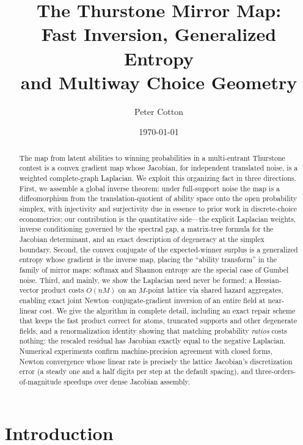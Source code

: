 \documentclass[11pt]{article}
\title{The Thurstone Mirror Map:\\ Fast Inversion, Generalized Entropy\\ and Multiway Choice Geometry}
\author{Peter Cotton}
\date{\today}
\theoremstyle{definition}
\theoremstyle{remark}
\begin{document}
\maketitle

\begin{abstract}
The map from latent abilities to winning probabilities in a multi-entrant
Thurstone contest is a convex gradient map whose Jacobian, for independent
translated noise, is a weighted complete-graph Laplacian.  We exploit this
organizing fact in three directions.  First, we assemble a global inverse
theorem: under full-support noise the map is a diffeomorphism from the
translation-quotient of ability space onto the open probability simplex, with
injectivity and surjectivity due in essence to prior work in discrete-choice
econometrics; our contribution is the quantitative side---the explicit
Laplacian weights, inverse conditioning governed by the spectral gap, a
matrix-tree formula for the Jacobian determinant, and an exact description of
degeneracy at the simplex boundary.  Second, the convex conjugate of the
expected-winner surplus is a generalized entropy whose gradient is the inverse
map, placing the ``ability transform'' in the family of mirror maps: softmax
and Shannon entropy are the special case of Gumbel noise.  Third, and mainly,
we show the Laplacian need never be formed: a Hessian-vector product costs
$O(nM)$ on an $M$-point lattice via shared hazard aggregates, enabling exact
joint Newton--conjugate-gradient inversion of an entire field at near-linear
cost.  We give the algorithm in complete detail, including an exact repair
scheme that keeps the fast product correct for atoms, truncated supports and
other degenerate fields, and a renormalization identity showing that matching
probability \emph{ratios} costs nothing: the rescaled residual has Jacobian
exactly equal to the negative Laplacian.  Numerical experiments confirm
machine-precision agreement with closed forms, Newton convergence whose
linear rate is precisely the lattice Jacobian's discretization error (a
steady one and a half digits per step at the default spacing), and
three-orders-of-magnitude speedups over dense Jacobian assembly.
\end{abstract}

\section{Introduction}
\label{sec:intro}
\end{document}
